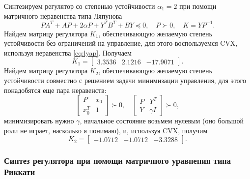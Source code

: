 Синтезируем регулятор со степенью устойчивости $\alpha_1=2$ при помощи
матричного неравенства типа Ляпунова
\begin{equation}
    PA^T+AP+2\alpha P+Y^TB^T+BY\preccurlyeq0,\quad P\succ0,\quad K=YP^{-1}.
    \label{eq:lyap}
\end{equation}
Найдем матрицу регулятора $K_1$, обеспечивающую желаемую степень 
устойчивости без ограничений на управление, для этого воспользуемся CVX, 
используя неравенства \eqref{eq:lyap}. Получаем
\begin{equation*}
    K_1=\begin{bmatrix}
        3.3536&	2.1216&	-17.9071
    \end{bmatrix}.
\end{equation*}
Найдем матрицу регулятора $K_2$, обеспечивающую желаемую степень 
устойчивости совместно с решением задачи минимизации управления,
для этого понадобятся еще пара неравенств:
\begin{equation}
    \begin{bmatrix}
        P&x_0\\
        x_0^T&1
    \end{bmatrix}\succ0,\quad
    \begin{bmatrix}
        P&Y^T\\
        Y&\gamma I
    \end{bmatrix}\succ0,
\end{equation}
минимизировать нужно $\gamma$, начальное состояние возьмем 
нулевым (оно большой роли не играет, насколько я понимаю), и, используя CVX, получим
\begin{equation*}
    K_2=\begin{bmatrix}
        -1.0712&	-1.0712&	-3.3288
    \end{bmatrix}.
\end{equation*}


\subsubsection{Синтез регулятора при помощи матричного
уравнения типа Риккати}

